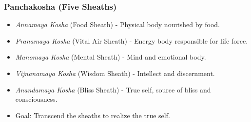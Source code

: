 \begin{frame}[fragile]\frametitle{Panchakosha (Five Sheaths)}

      \begin{itemize}
		\item \textit{Annamaya Kosha} (Food Sheath) - Physical body nourished by food.
		\item \textit{Pranamaya Kosha} (Vital Air Sheath) - Energy body responsible for life force.
		\item \textit{Manomaya Kosha} (Mental Sheath) - Mind and emotional body.
		\item \textit{Vijnanamaya Kosha} (Wisdom Sheath) - Intellect and discernment.
		\item \textit{Anandamaya Kosha} (Bliss Sheath) - True self, source of bliss and consciousness.
		\item Goal: Transcend the sheaths to realize the true self.
	  \end{itemize}

\end{frame}

